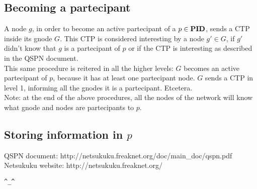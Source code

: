 \documentclass[a4paper]{article}
\newcommand{\href}[2]{ #1 }
\theoremstyle{definition}
\begin{document}
\subsection{Becoming a partecipant}
A node $g$, in order to become an active partecipant of a $p\in \textbf{PID}$, sends a
CTP inside its gnode $G$. This CTP is considered interesting by a node $g'\in
G$, if $g'$ didn't know that $g$ is a partecipant of $p$ or if the CTP is
interesting as described in the QSPN document\cite{qspndoc}.\\
This same procedure is reitered in all the higher levels: $G$ becomes an
active partecipant of $p$, because it has at least one partecipant node. $G$
sends a CTP in level 1, informing all the gnodes it is a partecipant.
Etcetera.\\

Note: at the end of the above procedures, all the nodes of the network will
know what gnode and nodes are partecipants to $p$.

\subsection{Storing information in $p$}


\begin{thebibliography}{99}
	 QSPN document:
		\href{http://netsukuku.freaknet.org/doc/main\_doc/qspn.pdf}{qspn.pdf}
	 Netsukuku website:
		\href{http://netsukuku.freaknet.org/}{http://netsukuku.freaknet.org/}
\end{thebibliography}
\newpage

\begin{center}
\verb|^_^|
\end{center}
\end{document}
